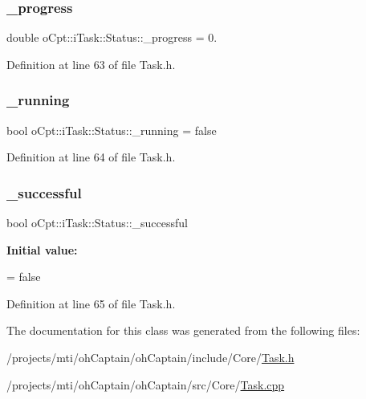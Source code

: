 \subsubsection{\texorpdfstring{\+\_\+progress}{\_progress}}
{\footnotesize\ttfamily double o\+Cpt\+::i\+Task\+::\+Status\+::\+\_\+progress = 0.\hspace{0.3cm}{\ttfamily [private]}}



Definition at line 63 of file Task.\+h.

\hypertarget{classo_cpt_1_1i_task_1_1_status_ab9896a94738163478468028599a8e4f7}{}\label{classo_cpt_1_1i_task_1_1_status_ab9896a94738163478468028599a8e4f7} 
\subsubsection{\texorpdfstring{\+\_\+running}{\_running}}
{\footnotesize\ttfamily bool o\+Cpt\+::i\+Task\+::\+Status\+::\+\_\+running = false\hspace{0.3cm}{\ttfamily [private]}}



Definition at line 64 of file Task.\+h.

\hypertarget{classo_cpt_1_1i_task_1_1_status_acac4794c074b5483c0c05f68c3689df9}{}\label{classo_cpt_1_1i_task_1_1_status_acac4794c074b5483c0c05f68c3689df9} 
\subsubsection{\texorpdfstring{\+\_\+successful}{\_successful}}
{\footnotesize\ttfamily bool o\+Cpt\+::i\+Task\+::\+Status\+::\+\_\+successful\hspace{0.3cm}{\ttfamily [private]}}

{\bfseries Initial value\+:}
\begin{DoxyCode}
=
                    \textcolor{keyword}{false}
\end{DoxyCode}


Definition at line 65 of file Task.\+h.



The documentation for this class was generated from the following files\+:\begin{DoxyCompactItemize}
\item 
/projects/mti/oh\+Captain/oh\+Captain/include/\+Core/\hyperlink{_task_8h}{Task.\+h}\item 
/projects/mti/oh\+Captain/oh\+Captain/src/\+Core/\hyperlink{_task_8cpp}{Task.\+cpp}\end{DoxyCompactItemize}
